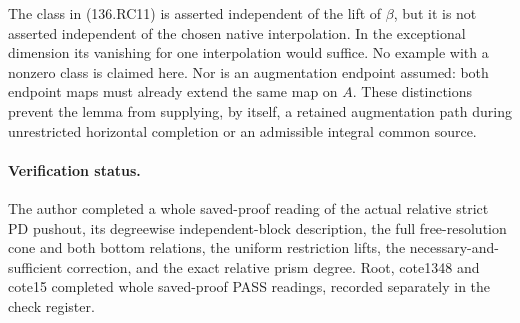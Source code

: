 The class in (136.RC11) is asserted independent of the lift of
\(\beta\), but it is not asserted independent of the chosen
native interpolation. In the exceptional dimension its vanishing
for one interpolation would suffice. No example with a nonzero
class is claimed here. Nor is an augmentation endpoint assumed:
both endpoint maps must already extend the same map on \(A\).
These distinctions prevent the lemma from supplying, by itself,
a retained augmentation path during unrestricted horizontal
completion or an admissible integral common source.

\paragraph{Verification status.}
The author completed a whole saved-proof reading of the actual
relative strict PD pushout, its degreewise independent-block
description, the full free-resolution cone and both bottom relations,
the uniform restriction lifts, the necessary-and-sufficient correction,
and the exact relative prism degree. Root, cote1348 and cote15 completed
whole saved-proof PASS readings, recorded separately in the check register.
